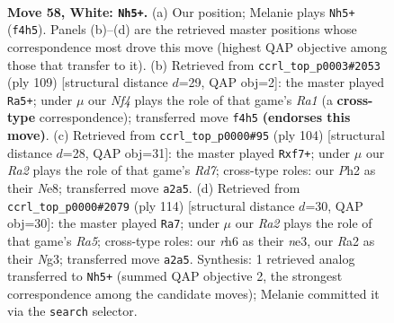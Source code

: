 \documentclass[11pt]{article}
\begin{document}
\clearpage

\begin{figure}[p]\centering
\begin{subfigure}{0.46\textwidth}\centering
\resizebox{\linewidth}{!}{%
\newchessgame
\chessboard[
  setfen={2R5/3r1pk1/7r/p7/4KN2/1P6/R2p3P/8 w - - 2 58},
  showmover=false,
  pgfstyle=straightmove, color=movearrow, markmove={f4-h5}
]}
\caption{}
\end{subfigure}\hfill
\begin{subfigure}{0.46\textwidth}\centering
\resizebox{\linewidth}{!}{%
\newchessgame
\chessboard[
  setfen={r7/4k3/3R2p1/4K3/P1R2P2/r7/8/8 b - - 4 55},
  showmover=false,
  pgfstyle=straightmove, color=movearrow, markmove={a8-a5}
]}
\caption{}
\end{subfigure}
\\[4pt]
\begin{subfigure}{0.46\textwidth}\centering
\resizebox{\linewidth}{!}{%
\newchessgame
\chessboard[
  setfen={4N3/1p1R1p2/p6r/8/5k2/4r3/2K5/6R1 w - - 12 53},
  showmover=false,
  pgfstyle=straightmove, color=movearrow, markmove={d7-f7}
]}
\caption{}
\end{subfigure}\hfill
\begin{subfigure}{0.46\textwidth}\centering
\resizebox{\linewidth}{!}{%
\newchessgame
\chessboard[
  setfen={2r4k/7p/8/R1p4p/5P2/4n1NK/2P5/8 w - - 5 58},
  showmover=false,
  pgfstyle=straightmove, color=movearrow, markmove={a5-a7}
]}
\caption{}
\end{subfigure}
\caption{\textbf{Move 58, White: \texttt{Nh5+}.} (a) Our position; Melanie plays \texttt{Nh5+} (\texttt{f4h5}). Panels (b)--(d) are the retrieved master positions whose correspondence most drove this move (highest QAP objective among those that transfer to it). (b) Retrieved from \texttt{ccrl\_top\_p0003\#2053} (ply 109) [structural distance $d$=29, QAP obj=2]: the master played \texttt{Ra5+}; under $\mu$ our \emph{Nf4} plays the role of that game's \emph{Ra1} (a \textbf{cross-type} correspondence); transferred move \texttt{f4h5} \textbf{(endorses this move)}. (c) Retrieved from \texttt{ccrl\_top\_p0000\#95} (ply 104) [structural distance $d$=28, QAP obj=31]: the master played \texttt{Rxf7+}; under $\mu$ our \emph{Ra2} plays the role of that game's \emph{Rd7}; cross-type roles: our \emph{P}h2 as their \emph{N}e8; transferred move \texttt{a2a5}. (d) Retrieved from \texttt{ccrl\_top\_p0000\#2079} (ply 114) [structural distance $d$=30, QAP obj=30]: the master played \texttt{Ra7}; under $\mu$ our \emph{Ra2} plays the role of that game's \emph{Ra5}; cross-type roles: our \emph{r}h6 as their \emph{n}e3, our \emph{R}a2 as their \emph{N}g3; transferred move \texttt{a2a5}. Synthesis: 1 retrieved analog transferred to \texttt{Nh5+} (summed QAP objective 2, the strongest correspondence among the candidate moves); Melanie committed it via the \texttt{search} selector.}
\label{fig:thought-m114}
\end{figure}
\end{document}
